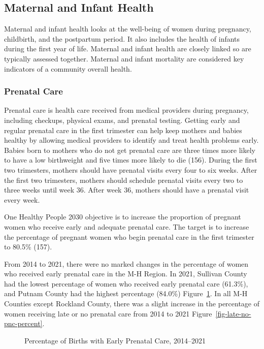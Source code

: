 \documentclass[
  english,
  letterpaper,
]{report}
\begin{document}
\subsection{Maternal and Infant
Health}\label{maternal-and-infant-health}

Maternal and infant health looks at the well-being of women during
pregnancy, childbirth, and the postpartum period. It also includes the
health of infants during the first year of life. Maternal and infant
health are closely linked so are typically assessed together. Maternal
and infant mortality are considered key indicators of a community
overall health.

\subsubsection{Prenatal Care}\label{prenatal-care}

Prenatal care is health care received from medical providers during
pregnancy, including checkups, physical exams, and prenatal testing.
Getting early and regular prenatal care in the first trimester can help
keep mothers and babies healthy by allowing medical providers to
identify and treat health problems early. Babies born to mothers who do
not get prenatal care are three times more likely to have a low
birthweight and five times more likely to die (156). During the first
two trimesters, mothers should have prenatal visits every four to six
weeks. After the first two trimesters, mothers should schedule prenatal
visits every two to three weeks until week 36. After week 36, mothers
should have a prenatal visit every week.

One Healthy People 2030 objective is to increase the proportion of
pregnant women who receive early and adequate prenatal care. The target
is to increase the percentage of pregnant women who begin prenatal care
in the first trimester to 80.5\% (157).

From 2014 to 2021, there were no marked changes in the percentage of
women who received early prenatal care in the M-H Region. In 2021,
Sullivan County had the lowest percentage of women who received early
prenatal care (61.3\%), and Putnam County had the highest percentage
(84.0\%) Figure~\ref{fig-early-pnc-percent}. In all M-H Counties except
Rockland County, there was a slight increase in the percentage of women
receiving late or no prenatal care from 2014 to 2021
Figure~\ref{fig-late-no-pnc-percent}.

\begin{figure}


\caption{\label{fig-early-pnc-percent}Percentage of Births with Early
Prenatal Care, 2014--2021}

\end{figure}%
\end{document}
